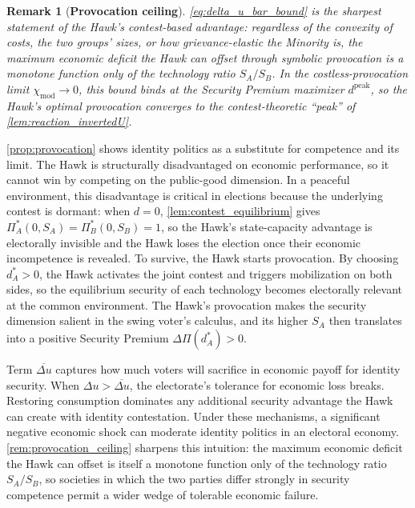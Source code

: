 \documentclass[11pt,twoside]{extarticle}
\newtheorem{remark}{Remark}
\begin{document}
\begin{remark}[\textbf{Provocation ceiling}]\label{rem:provocation_ceiling}
\autoref{eq:delta_u_bar_bound} is the sharpest statement of the Hawk's contest-based advantage: regardless of the convexity of costs, the two groups' sizes, or how grievance-elastic the Minority is, the maximum economic deficit the Hawk can offset through symbolic provocation is a monotone function only of the technology ratio $S_A/S_B$. In the costless-provocation limit $\chi_{\mathrm{mod}}\to 0$, this bound binds at the Security Premium maximizer $d^{\mathrm{peak}}$, so the Hawk's optimal provocation converges to the contest-theoretic ``peak'' of \autoref{lem:reaction_invertedU}.
\end{remark}

\autoref{prop:provocation} shows identity politics as a substitute for competence and its limit. The Hawk is structurally disadvantaged on economic performance, so it cannot win by competing on the public-good dimension. In a peaceful environment, this disadvantage is critical in elections because the underlying contest is dormant: when $d=0$, \autoref{lem:contest_equilibrium} gives $\Pi_A^*(0,S_A)=\Pi_B^*(0,S_B)=1$, so the Hawk's state-capacity advantage is electorally invisible and the Hawk loses the election once their economic incompetence is revealed. To survive, the Hawk starts provocation. By choosing $d_A^*>0$, the Hawk activates the joint contest and triggers mobilization on both sides, so the equilibrium security of each technology becomes electorally relevant at the common environment. The Hawk's provocation makes the security dimension salient in the swing voter's calculus, and its higher $S_A$ then translates into a positive Security Premium $\Delta\Pi(d_A^*)>0$.

Term $\overline{\Delta u}$ captures how much voters will sacrifice in economic payoff for identity security. When $\Delta u>\overline{\Delta u}$, the electorate's tolerance for economic loss breaks. Restoring consumption dominates any additional security advantage the Hawk can create with identity contestation. Under these mechanisms, a significant negative economic shock can moderate identity politics in an electoral economy. \autoref{rem:provocation_ceiling} sharpens this intuition: the maximum economic deficit the Hawk can offset is itself a monotone function only of the technology ratio $S_A/S_B$, so societies in which the two parties differ strongly in security competence permit a wider wedge of tolerable economic failure.
\end{document}
